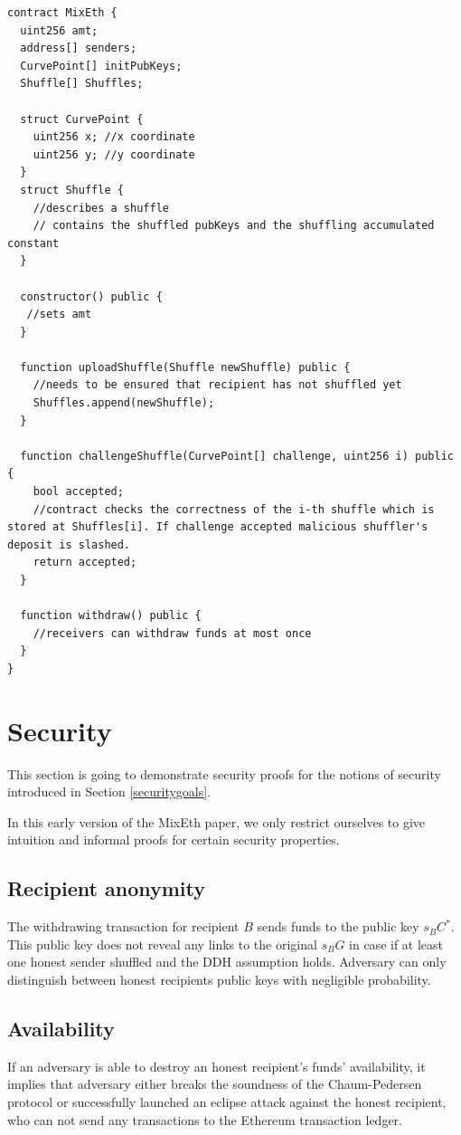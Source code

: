 \documentclass[a4paper]{article}
\theoremstyle{definition}
\begin{document}
\medskip
\begin{lstlisting}[caption=MixEth contract pseudocode]
contract MixEth {
  uint256 amt;
  address[] senders;
  CurvePoint[] initPubKeys;
  Shuffle[] Shuffles;
  
  struct CurvePoint {
    uint256 x; //x coordinate
    uint256 y; //y coordinate
  }
  struct Shuffle { 
    //describes a shuffle
    // contains the shuffled pubKeys and the shuffling accumulated constant
  }
  
  constructor() public {
   //sets amt
  }
  
  function uploadShuffle(Shuffle newShuffle) public {
    //needs to be ensured that recipient has not shuffled yet
    Shuffles.append(newShuffle);  
  }
  
  function challengeShuffle(CurvePoint[] challenge, uint256 i) public {
    bool accepted;
    //contract checks the correctness of the i-th shuffle which is stored at Shuffles[i]. If challenge accepted malicious shuffler's deposit is slashed.
    return accepted;
  }
  
  function withdraw() public {
    //receivers can withdraw funds at most once
  }   
}
\end{lstlisting}

\section{Security}
This section is going to demonstrate security proofs for the notions of security introduced in Section \ref{securitygoals}.

In this early version of the MixEth paper, we only restrict ourselves to give intuition and informal proofs for certain security properties.

\subsection{Recipient anonymity}
The withdrawing transaction for recipient $B$ sends funds to the public key $s_{B}C^{*}$. This public key does not reveal any links to the original $s_{B}G$ in case if at least one honest sender shuffled and the DDH assumption holds. Adversary can only distinguish between honest recipients public keys with negligible probability.
\subsection{Availability}
If an adversary is able to destroy an honest recipient's funds' availability, it implies that adversary either breaks the soundness of the Chaum-Pedersen protocol or successfully launched an eclipse attack against the honest recipient, who can not send any transactions to the Ethereum transaction ledger. 
\end{document}
